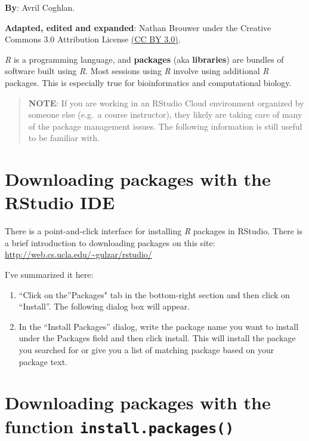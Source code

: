 \documentclass[
]{book}
\providecommand{\tightlist}{%
  \setlength{\itemsep}{0pt}\setlength{\parskip}{0pt}}
\begin{document}
\textbf{By}: Avril Coghlan.

\textbf{Adapted, edited and expanded}: Nathan Brouwer under the Creative Commons 3.0 Attribution License \href{https://creativecommons.org/licenses/by/3.0/}{(CC BY 3.0)}.

\emph{R} is a programming language, and \textbf{packages} (aka \textbf{libraries}) are bundles of software built using \emph{R}. Most sessions using \emph{R} involve using additional \emph{R} packages. This is especially true for bioinformatics and computational biology.

\begin{quote}
\textbf{NOTE}: If you are working in an RStudio Cloud environment organized by someone else (e.g.~a course instructor), they likely are taking care of many of the package management issues. The following information is still useful to be familiar with.
\end{quote}

\hypertarget{downloading-packages-with-the-rstudio-ide}{%
\section{Downloading packages with the RStudio IDE}\label{downloading-packages-with-the-rstudio-ide}}

There is a point-and-click interface for installing \emph{R} packages in RStudio. There is a brief introduction to downloading packages on this site: \url{http://web.cs.ucla.edu/~gulzar/rstudio/}

I've summarized it here:

\begin{enumerate}
\def\labelenumi{\arabic{enumi}.}
\tightlist
\item
  ``Click on the''Packages" tab in the bottom-right section and then click on ``Install''. The following dialog box will appear.
\item
  In the ``Install Packages'' dialog, write the package name you want to install under the Packages field and then click install. This will install the package you searched for or give you a list of matching package based on your package text.
\end{enumerate}

\hypertarget{downloading-packages-with-the-function-install.packages}{%
\section{\texorpdfstring{Downloading packages with the function \texttt{install.packages()}}{Downloading packages with the function install.packages()}}\label{downloading-packages-with-the-function-install.packages}}
\end{document}
